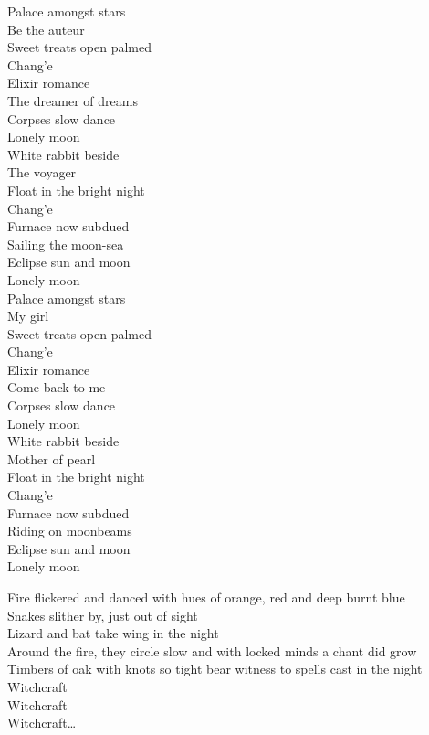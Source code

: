 Palace amongst stars \\
Be the auteur \\
Sweet treats open palmed \\
Chang'e \\
Elixir romance \\
The dreamer of dreams \\
Corpses slow dance \\
Lonely moon \\
White rabbit beside \\
The voyager \\
Float in the bright night \\
Chang'e \\
Furnace now subdued \\
Sailing the moon-sea \\
Eclipse sun and moon \\
Lonely moon \\
Palace amongst stars \\
My girl \\
Sweet treats open palmed \\
Chang'e \\
Elixir romance \\
Come back to me \\
Corpses slow dance \\
Lonely moon \\
White rabbit beside \\
Mother of pearl \\
Float in the bright night \\
Chang'e \\
Furnace now subdued \\
Riding on moonbeams \\
Eclipse sun and moon \\
Lonely moon \\


Fire flickered and danced with hues of orange, red and deep burnt blue \\
Snakes slither by, just out of sight \\
Lizard and bat take wing in the night \\
Around the fire, they circle slow and with locked minds a chant did grow \\
Timbers of oak with knots so tight bear witness to spells cast in the night \\

Witchcraft \\
Witchcraft \\
Witchcraft… \\

